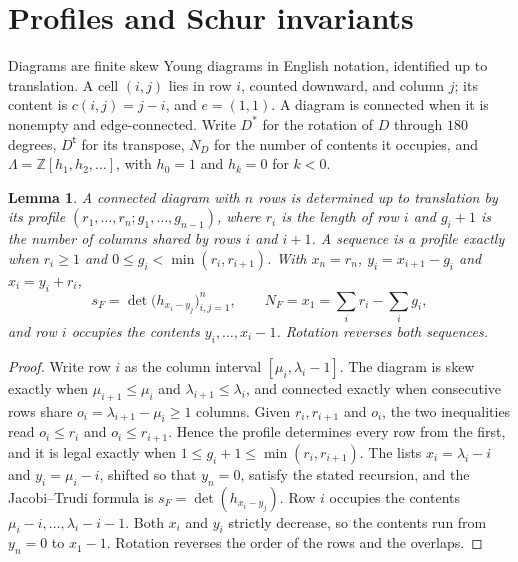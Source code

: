 \documentclass[11pt,a4paper]{amsart}
\numberwithin{equation}{section}
\theoremstyle{plain}
\newtheorem{lemma}[theorem]{Lemma}
\theoremstyle{definition}
\newcommand{\Lam}{\Lambda}
\newcommand{\Z}{\mathbb Z}
\begin{document}
\section{Profiles and Schur invariants}\label{sec:diagrams}

Diagrams are finite skew Young diagrams in English notation, identified up to translation.  A cell \((i,j)\) lies in row \(i\), counted downward, and column \(j\); its content is \(c(i,j)=j-i\), and \(e=(1,1)\).  A diagram is connected when it is nonempty and edge-connected.  Write \(D^*\) for the rotation of \(D\) through \(180\) degrees, \(D^{\mathsf t}\) for its transpose, \(N_D\) for the number of contents it occupies, and \(\Lam=\Z[h_1,h_2,\ldots]\), with \(h_0=1\) and \(h_k=0\) for \(k<0\).

\begin{lemma}\label{lem:profiles}
A connected diagram with \(n\) rows is determined up to translation by its \emph{profile} \((r_1,\ldots,r_n;g_1,\ldots,g_{n-1})\), where \(r_i\) is the length of row \(i\) and \(g_i+1\) is the number of columns shared by rows \(i\) and \(i+1\).  A sequence is a profile exactly when \(r_i\ge1\) and \(0\le g_i<\min(r_i,r_{i+1})\).  With \(x_n=r_n\), \(y_i=x_{i+1}-g_i\) and \(x_i=y_i+r_i\),
\begin{equation}\label{eq:jt}
 s_F=\det\bigl(h_{x_i-y_j}\bigr)_{i,j=1}^n,\qquad N_F=x_1=\sum_ir_i-\sum_ig_i,
\end{equation}
and row \(i\) occupies the contents \(y_i,\ldots,x_i-1\).  Rotation reverses both sequences.
\end{lemma}

\begin{proof}
Write row \(i\) as the column interval \([\mu_i,\lambda_i-1]\).  The diagram is skew exactly when \(\mu_{i+1}\le\mu_i\) and \(\lambda_{i+1}\le\lambda_i\), and connected exactly when consecutive rows share \(o_i=\lambda_{i+1}-\mu_i\ge1\) columns.  Given \(r_i,r_{i+1}\) and \(o_i\), the two inequalities read \(o_i\le r_i\) and \(o_i\le r_{i+1}\).  Hence the profile determines every row from the first, and it is legal exactly when \(1\le g_i+1\le\min(r_i,r_{i+1})\).  The lists \(x_i=\lambda_i-i\) and \(y_i=\mu_i-i\), shifted so that \(y_n=0\), satisfy the stated recursion, and the Jacobi--Trudi formula is \(s_F=\det(h_{x_i-y_j})\).  Row \(i\) occupies the contents \(\mu_i-i,\ldots,\lambda_i-i-1\).  Both \(x_i\) and \(y_i\) strictly decrease, so the contents run from \(y_n=0\) to \(x_1-1\).  Rotation reverses the order of the rows and the overlaps.
\end{proof}
\end{document}

